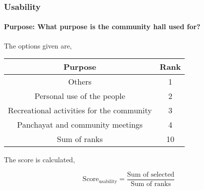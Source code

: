 \documentclass[oneside,twocolumn]{article}
\newcommand{\tsub}[2]{\text{#1}_{\text{#2}}}
\newcommand{\dsub}[2]{\dfrac{\text{#1}}{\text{#2}}}
\newcommand{\multsel}[1]
{
	\[
		\tsub{Score}{#1} = \dsub{Sum of selected}{Sum of ranks}
	\]
}
\newenvironment{ttable}
{
\begin{center}
\begin{tabular}{c|c}
\hline
}
{
\\ \hline
\end{tabular}
\end{center}
}
\begin{document}
\subsubsection{Usability}
\paragraph{Purpose: What purpose is the community hall used for?}
The options given are,
\begin{ttable}
	Purpose & Rank \\ \hline
	Others & 1 \\
	Personal use of the people & 2 \\
	Recreational activities for the community & 3 \\
	Panchayat and community meetings & 4 \\ \hline
	Sum of ranks & 10
\end{ttable}
The score is calculated,
\multsel{usability}
\end{document}
